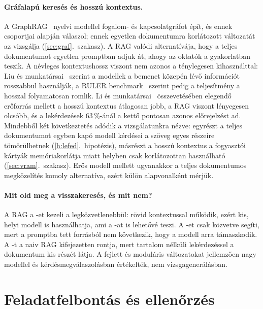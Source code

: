 \paragraph{Gráfalapú keresés és hosszú kontextus.} A GraphRAG~\cite{edge2024graphrag} nyelvi modellel
fogalom- és kapcsolatgráfot épít, és ennek csoportjai alapján válaszol; ennek egyetlen dokumentumra
korlátozott változatát az  vizsgálja (\ref{sec:graf}.~szakasz). A RAG valódi alternatívája, hogy a
teljes dokumentumot egyetlen promptban adjuk át, ahogy az oktatók a gyakorlatban teszik. A névleges
kontextushossz viszont nem azonos a ténylegesen kihasználttal: Liu és munkatársai~\cite{liu2024lost}
szerint a modellek a bemenet közepén lévő információt rosszabbul használják, a RULER
benchmark~\cite{hsieh2024ruler} szerint pedig a teljesítmény a hosszal folyamatosan romlik. Li és
munkatársai~\cite{li2024ragvslc} összevetésében elegendő erőforrás mellett a hosszú kontextus átlagosan
jobb, a RAG viszont lényegesen olcsóbb, és a lekérdezések 63\,\%-ánál
a kettő pontosan azonos előrejelzést ad. Mindebből két következtetés adódik a vizsgálatunkra nézve:
egyrészt a teljes dokumentumot egyben kapó modell kérdései a szöveg egyes részeire tömörülhetnek
(\ref{h:lefed}.~hipotézis), másrészt a hosszú kontextus a fogyasztói kártyák memóriakorlátja miatt helyben
csak korlátozottan használható (\ref{sec:vram}.~szakasz). Erős modell mellett ugyanakkor a teljes
dokumentumos megközelítés komoly alternatíva, ezért külön alapvonalként mérjük.

\paragraph{Mit old meg a visszakeresés, és mit nem?} A RAG a -et kezeli a legközvetlenebbül: rövid
kontextussal működik, ezért kis, helyi modell is használhatja, ami a -at is lehetővé teszi. A -et csak
közvetve segíti, mert a promptba tett forrásból nem következik, hogy a modell arra támaszkodik. A -t a
naiv RAG kifejezetten rontja, mert tartalom nélküli lekérdezéssel a dokumentum kis részét látja. A fejlett
és moduláris változatokat jellemzően nagy modellel és kérdésmegválaszolásban értékelték, nem
vizsgagenerálásban.

\section{Feladatfelbontás és ellenőrzés}
\label{sec:irod-felbontas}

